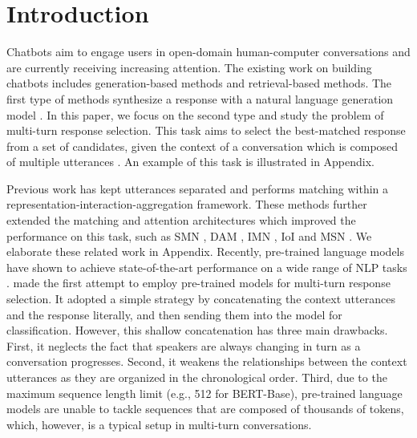 \documentclass[sigconf]{acmart}
\begin{document}
\maketitle

\section{Introduction}

  Chatbots aim to engage users in open-domain human-computer conversations and are currently receiving increasing attention. 
  The existing work on building chatbots includes generation-based methods and retrieval-based methods.
  The first type of methods synthesize a response with a natural language generation model \cite{DBLP:conf/aaai/SerbanSBCP16}.
  In this paper, we focus on the second type and study the problem of multi-turn response selection.
  This task aims to select the best-matched response from a set of candidates, given the context of a conversation which is composed of multiple utterances \cite{DBLP:conf/sigdial/LowePSP15,DBLP:journals/dad/LowePSCLP17,DBLP:conf/acl/WuWXZL17}.
  An example of this task is illustrated in Appendix.
  
  Previous work has kept utterances separated and performs matching within a representation-interaction-aggregation framework. 
  These methods further extended the matching and attention architectures which improved the performance on this task, such as SMN \cite{DBLP:conf/acl/WuWXZL17}, DAM \cite{DBLP:conf/acl/WuLCZDYZL18}, IMN \cite{DBLP:conf/cikm/GuLL19}, IoI\cite{DBLP:conf/acl/TaoWXHZY19} and MSN \cite{DBLP:conf/emnlp/YuanZLLZHH19}. 
  We elaborate these related work in Appendix. 
  Recently, pre-trained language models have shown to achieve state-of-the-art performance on a wide range of NLP tasks \cite{DBLP:conf/naacl/DevlinCLT19}.
  \cite{DBLP:conf/acl/HendersonVGCBCS19} made the first attempt to employ pre-trained models for multi-turn response selection.
  It adopted a simple strategy by concatenating the context utterances and the response literally, and then sending them into the model for classification.
  However, this shallow concatenation has three main drawbacks.
  First, it neglects the fact that speakers are always changing in turn as a conversation progresses.
  Second, it weakens the relationships between the context utterances as they are organized in the chronological order.
  Third, due to the maximum sequence length limit (e.g., 512 for BERT-Base), pre-trained language models are unable to tackle sequences that are composed of thousands of tokens, which, however, is a typical setup in multi-turn conversations.
\end{document}
